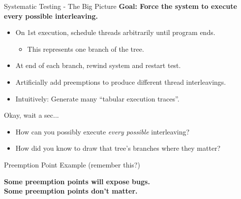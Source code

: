 \documentclass[xcolor=dvipsnames]{beamer}
\begin{document}

\begin{frame}{Systematic Testing - The Big Picture}
	\textbf{Goal: Force the system to execute every possible interleaving.}
	\begin{itemize}
		\item On 1st execution, schedule threads arbitrarily until program ends.
			\begin{itemize}
				\item This represents one branch of the tree.
			\end{itemize}
		\item At end of each branch, rewind system and restart test.
		\item Artificially add preemptions to produce different thread interleavings.
		\item Intuitively: Generate many ``tabular execution traces''.
	\end{itemize}
	\pause
	\linegap

	Okay, wait a sec...
	\begin{itemize}
		\item How can you possibly execute {\em every possible} interleaving?
		\item How did you know to draw that tree's branches where they matter?
	\end{itemize}
\end{frame}

\begin{frame}{Preemption Point Example (remember this?)}
	\linegap

	{\bf Some preemption points will expose bugs. \\
	Some preemption points don't matter.}

\end{frame}
\end{document}
